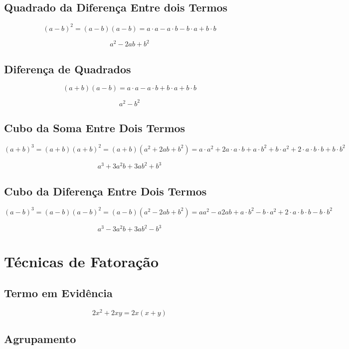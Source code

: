 \subsection{Quadrado da Diferença Entre dois Termos}

	$$(a-b)^{2} = (a-b)(a-b) = a\cdot a - a\cdot b - b\cdot a + b\cdot b $$
	
	$$a^2-2ab+b^2$$
	
\subsection{Diferença de Quadrados}

	$$(a+b)(a-b) = a\cdot a - a\cdot b + b\cdot a + b\cdot b $$
	
	$$a^{2}-b^{2}$$
	
\subsection{Cubo da Soma Entre Dois Termos}

	$$(a+b)^{3} = (a+b)(a+b)^{2} = (a+b)(a^{2}+2ab+b^{2}) = a\cdot a^{2} + 2a\cdot a \cdot b + a\cdot b^{2} + b\cdot a^{2} + 2\cdot a \cdot b\cdot b + b\cdot b^{2} $$
	
	$$a^{3} + 3a^{2}b + 3ab^{2}+b^{3}$$

\subsection{Cubo da Diferença Entre Dois Termos}

$$(a-b)^{3} = (a-b)(a-b)^{2} = (a-b)(a^{2}-2ab+b^{2}) = a a^{2} - a2ab + a\cdot b^{2} - b\cdot a^{2} + 2\cdot a \cdot b\cdot b - b\cdot b^{2} $$
	
	$$a^{3} - 3a^{2}b + 3ab^{2} - b^{3}$$
	
\section{Técnicas de Fatoração}


\subsection{Termo em Evidência}

	$$2x^{2}+2xy = 2x(x+y)$$
	
\subsection{Agrupamento}

